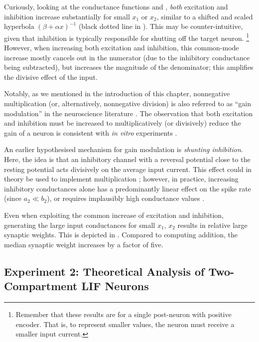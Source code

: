 Curiously, looking at the conductance functions \gE and \gI, \emph{both} excitation and inhibition increase substantially for small $x_1$ or $x_2$, similar to a shifted and scaled hyperbola  $(\beta + \alpha x)^{-1}$ (black dotted line in ).
This may be counter-intuitive, given that inhibition is typically responsible for shutting off the target neuron.%
\footnote{Remember that these results are for a single post-neuron with positive encoder. That is, to represent smaller values, the neuron must receive a smaller input current.}
However, when increasing both excitation and inhibition, this common-mode increase mostly cancels out in the numerator (due to the inhibitory conductance being subtracted), but increases the magnitude of the denominator; this amplifies the divisive effect of the input.

Notably, as we mentioned in the introduction of this chapter, nonnegative multiplication (or, alternatively, nonnegative division) is also referred to as \enquote{gain modulation} in the neuroscience literature \citep{salinas2000gain}.
The observation that both excitation and inhibition must be increased to multiplicatively (or divisively) reduce the gain of a neuron is consistent with \emph{in vitro} experiments \citep{chance2002gain}.

An earlier hypothesised mechanism for gain modulation is \emph{shunting inhibition}.
Here, the idea is that an inhibitory channel with a reversal potential close to the resting potential acts divisively on the average input current.
This effect could in theory be used to implement multiplication \citep{koch1992multiplying}; however, in practice, increasing inhibitory conductances alone has a predominantly linear effect on the spike rate (since $a_2 \ll b_2$), or requires implausibly high conductance values \citep{holt1997shunting,abbott2005drivers}.

Even when exploiting the common increase of excitation and inhibition, generating the large input conductances for small $x_1$, $x_2$ results in relative large synaptic weights.
This is depicted in .
Compared to computing addition, the median synaptic weight increases by a factor of five.

\subsection{Experiment 2: Theoretical Analysis of Two-Compartment LIF Neurons}
\label{sec:two_comp_lif_experiment_2}

